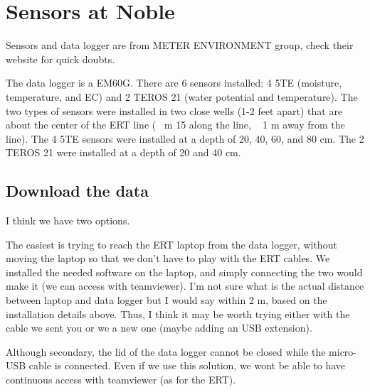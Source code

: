 \documentclass[a4paper,12pt]{article}
\title{}
\author{Luca Peruzzo}
\date{}
\begin{document}
\setcounter{secnumdepth}{0}
\newcommand{\myseparator}{\noindent\makebox[\linewidth]{\resizebox{0.5\linewidth}{1pt}{$\bullet$}}\bigskip}
\newcommand{\subwidth}{0.48}
\graphicspath{{./../}{./../figures/}{./figures/}}

\section{Sensors at Noble}

Sensors and data logger are from  METER ENVIRONMENT group, check their website for quick doubts.

The data logger is a EM60G.
There are 6 sensors installed: 4 5TE (moisture, temperature, and EC) and 2 TEROS 21 (water potential and temperature).
The two types of sensors were installed in two close wells (1-2 feet apart) that are about the center of the ERT line (~ m 15 along the line, ~ 1 m away from the line).
The 4 5TE sensors were installed at a depth of 20, 40, 60, and 80 cm.
The 2 TEROS 21 were installed at a depth of 20 and 40 cm.

\subsection{Download the data}

I think we have two options.

The easiest is trying to reach the ERT laptop from the data logger, without moving the laptop so that we don't have to play with the ERT cables.
We installed the needed software on the laptop, and simply connecting the two would make it (we can access with teamviewer).
I'm not sure what is the actual distance between laptop and data logger but I would say within 2 m, based on the installation details above.
Thus, I think it may be worth trying either with the cable we sent you or we a new one (maybe adding an USB extension).

Although secondary, the lid of the data logger cannot be closed while the micro-USB cable is connected.
Even if we use this solution, we wont be able to have continuous access with teamviewer (as for the ERT).
\end{document}
